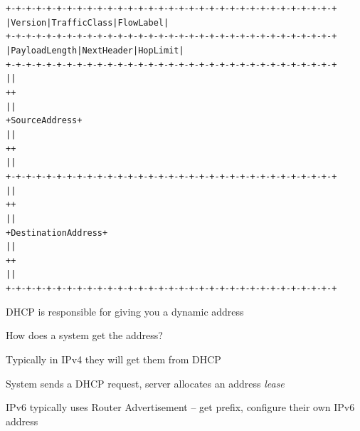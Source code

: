 \documentclass[Screen16to9,17pt]{foils}
\begin{document}
\vskip -1cm
\begin{alltt}\footnotesize
   +-+-+-+-+-+-+-+-+-+-+-+-+-+-+-+-+-+-+-+-+-+-+-+-+-+-+-+-+-+-+-+-+
   |Version| Traffic Class |           Flow Label                  |
   +-+-+-+-+-+-+-+-+-+-+-+-+-+-+-+-+-+-+-+-+-+-+-+-+-+-+-+-+-+-+-+-+
   |         Payload Length        |  Next Header  |   Hop Limit   |
   +-+-+-+-+-+-+-+-+-+-+-+-+-+-+-+-+-+-+-+-+-+-+-+-+-+-+-+-+-+-+-+-+
   |                                                               |
   +                                                               +
   |                                                               |
   +                         Source Address                        +
   |                                                               |
   +                                                               +
   |                                                               |
   +-+-+-+-+-+-+-+-+-+-+-+-+-+-+-+-+-+-+-+-+-+-+-+-+-+-+-+-+-+-+-+-+
   |                                                               |
   +                                                               +
   |                                                               |
   +                      Destination Address                      +
   |                                                               |
   +                                                               +
   |                                                               |
   +-+-+-+-+-+-+-+-+-+-+-+-+-+-+-+-+-+-+-+-+-+-+-+-+-+-+-+-+-+-+-+-+
\end{alltt}






DHCP is responsible for giving you a dynamic address





\begin{list1}
\item How does a system get the address?
\item Typically in  IPv4 they will get them from DHCP
\item System sends a DHCP request, server allocates an address \emph{lease}
\item IPv6 typically uses Router Advertisement -- get prefix, configure their own IPv6 address
\end{list1}
\end{document}
